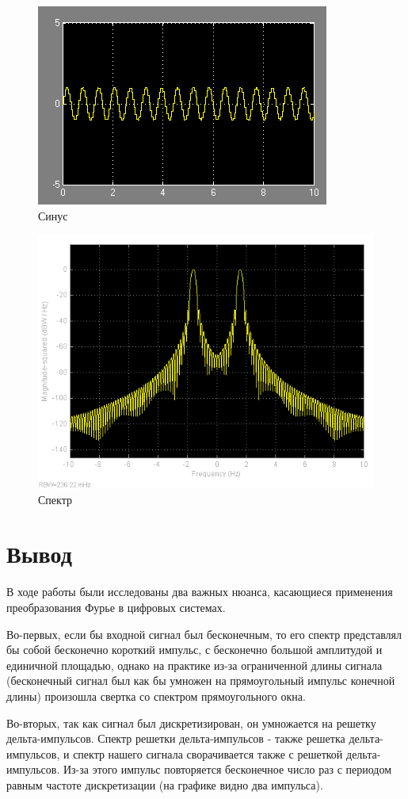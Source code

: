 \begin{figure}[H]
   \includegraphics[scale=0.7]{lab4/sin_simulink.png}
   \caption{Синус}
\end{figure}

\begin{figure}[H]
   \includegraphics[scale=0.7]{lab4/scope.png}
   \caption{Спектр}
\end{figure}

\section{Вывод}

В ходе работы были исследованы два важных нюанса, касающиеся применения преобразования Фурье в цифровых системах.

Во-первых, если бы входной сигнал был бесконечным, то его спектр представлял бы собой бесконечно короткий импульс, с бесконечно большой амплитудой и единичной площадью, однако на практике из-за ограниченной длины сигнала (бесконечный сигнал был как бы умножен на прямоугольный импульс конечной длины) произошла свертка со спектром прямоугольного окна.

Во-вторых, так как сигнал был дискретизирован, он умножается на решетку дельта-импульсов. Спектр решетки дельта-импульсов - также решетка дельта-импульсов, и спектр нашего сигнала сворачивается также с решеткой дельта-импульсов. Из-за этого импульс повторяется бесконечное число раз с периодом равным частоте дискретизации (на графике видно два импульса).